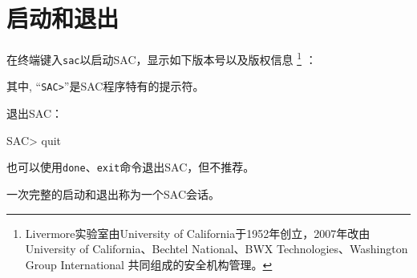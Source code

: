 \section{启动和退出}
在终端键入\verb+sac+以启动SAC，显示如下版本号以及版权信息
\footnote{Livermore实验室由University of California于1952年创立，2007年改由
University of California、Bechtel National、BWX Technologies、Washington Group International
共同组成的安全机构管理。}
：
其中, ``\verb+SAC>+''是SAC程序特有的提示符。

退出SAC：
\begin{SACCode}
SAC> quit
\end{SACCode}
也可以使用\verb+done+、\verb+exit+命令退出SAC，但不推荐。

一次完整的启动和退出称为一个SAC会话。
